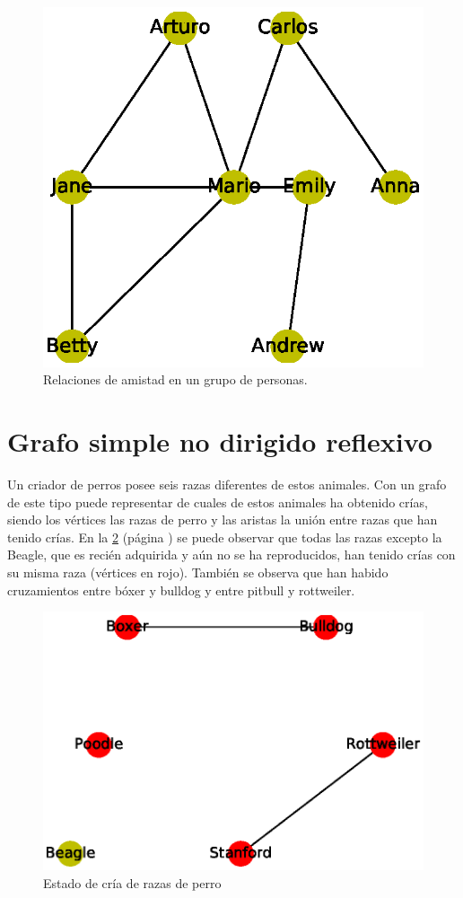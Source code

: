 \documentclass{article}
\begin{document}
\begin{figure}
  \includegraphics[width=.8\columnwidth]{2.eps}
  \vspace*{-8mm}
  \caption{Relaciones de amistad en un grupo de personas.}
  \label{fig:2}
\end{figure}

\section{Grafo simple no dirigido reflexivo}

Un criador de perros posee seis razas diferentes de estos animales. Con un grafo de este tipo puede representar de cuales de estos animales ha obtenido crías, siendo los vértices las razas de perro y las aristas la unión entre razas que han tenido crías.
En la \ref{fig:3} (página \pageref{fig:3}) se puede observar que todas las razas excepto la Beagle, que es recién adquirida y aún no se ha reproducidos, han tenido crías con su misma raza (vértices en rojo). También se observa que han habido cruzamientos entre bóxer y bulldog y entre pitbull y rottweiler.



\begin{figure}
  \includegraphics[width=.8\columnwidth]{3.eps}
  \vspace*{-8mm}
  \caption{Estado de cría de razas de perro}
  \label{fig:3}
\end{figure}
\end{document}
